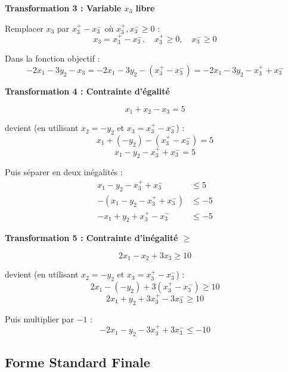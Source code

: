 \documentclass[12pt,a4paper]{article}
\begin{document}
\begin{solution}
\textbf{Transformation 3 : Variable $x_3$ libre}

Remplacer $x_3$ par $x_3^+ - x_3^-$ où $x_3^+, x_3^- \geq 0$ :
$$x_3 = x_3^+ - x_3^-, \quad x_3^+ \geq 0, \quad x_3^- \geq 0$$

Dans la fonction objectif :
$$-2x_1 - 3y_2 - x_3 = -2x_1 - 3y_2 - (x_3^+ - x_3^-) = -2x_1 - 3y_2 - x_3^+ + x_3^-$$
\end{solution}

\begin{solution}
\textbf{Transformation 4 : Contrainte d'égalité}

$$x_1 + x_2 - x_3 = 5$$

devient (en utilisant $x_2 = -y_2$ et $x_3 = x_3^+ - x_3^-$) :
$$x_1 + (-y_2) - (x_3^+ - x_3^-) = 5$$
$$x_1 - y_2 - x_3^+ + x_3^- = 5$$

Puis séparer en deux inégalités :
\begin{align*}
x_1 - y_2 - x_3^+ + x_3^- &\leq 5\\
-(x_1 - y_2 - x_3^+ + x_3^-) &\leq -5\\
-x_1 + y_2 + x_3^+ - x_3^- &\leq -5
\end{align*}
\end{solution}

\begin{solution}
\textbf{Transformation 5 : Contrainte d'inégalité $\geq$}

$$2x_1 - x_2 + 3x_3 \geq 10$$

devient (en utilisant $x_2 = -y_2$ et $x_3 = x_3^+ - x_3^-$) :
$$2x_1 - (-y_2) + 3(x_3^+ - x_3^-) \geq 10$$
$$2x_1 + y_2 + 3x_3^+ - 3x_3^- \geq 10$$

Puis multiplier par $-1$ :
$$-2x_1 - y_2 - 3x_3^+ + 3x_3^- \leq -10$$
\end{solution}

\newpage
\subsection{Forme Standard Finale}
\end{document}
